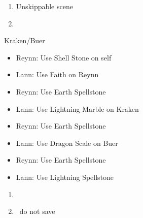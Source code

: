 \begin{enumerate}[resume]
    \item Unskippable scene
    \item \save\
\end{enumerate}
\begin{battle}[]{Kraken/Buer}
    \begin{itemize}
        \item Reynn: Use Shell Stone on self
        \item Lann: Use Faith on Reynn
        \item Reynn: Use Earth Spellstone
        \item Lann: Use Lightning Marble on Kraken
        \item Reynn: Use Earth Spellstone
        \item Lann: Use Dragon Scale on Buer
        \item Reynn: Use Earth Spellstone
        \item Lann: Use Lightning Spellstone
    \end{itemize}
\end{battle}
\begin{enumerate}[resume]
    \item \save\
    \item \cs\, do not save 
\end{enumerate}